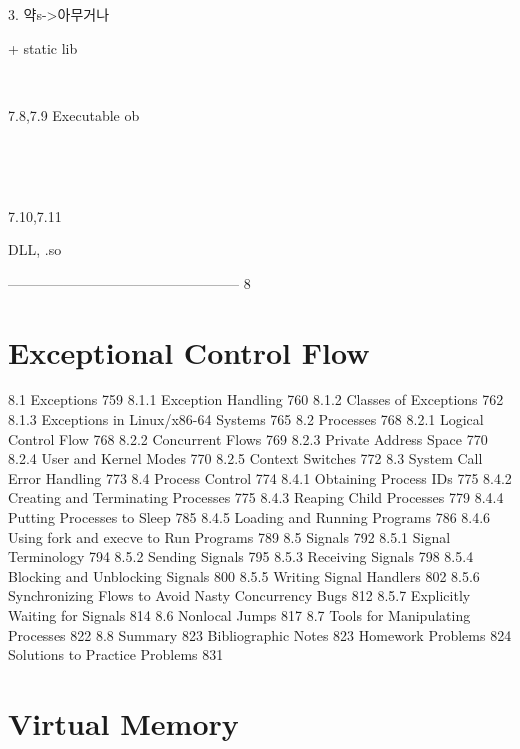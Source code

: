 3. 약s->아무거나

+ static lib

​

7.8,7.9 Executable ob~

​

​

7.10,7.11

DLL, .so 














--------------------------------------------------
8
\section{Exceptional Control Flow}
8.1 Exceptions 759
8.1.1 Exception Handling 760
8.1.2 Classes of Exceptions 762
8.1.3 Exceptions in Linux/x86-64 Systems 765
8.2 Processes 768
8.2.1 Logical Control Flow 768
8.2.2 Concurrent Flows 769
8.2.3 Private Address Space 770
8.2.4 User and Kernel Modes 770
8.2.5 Context Switches 772
8.3 System Call Error Handling 773
8.4 Process Control 774
8.4.1 Obtaining Process IDs 775
8.4.2 Creating and Terminating Processes 775
8.4.3 Reaping Child Processes 779
8.4.4 Putting Processes to Sleep 785
8.4.5 Loading and Running Programs 786
8.4.6 Using fork and execve to Run Programs 789
8.5 Signals 792
8.5.1 Signal Terminology 794
8.5.2 Sending Signals 795
8.5.3 Receiving Signals 798
8.5.4 Blocking and Unblocking Signals 800
8.5.5 Writing Signal Handlers 802
8.5.6 Synchronizing Flows to Avoid Nasty Concurrency Bugs 812
8.5.7 Explicitly Waiting for Signals 814
8.6 Nonlocal Jumps 817
8.7 Tools for Manipulating Processes 822
8.8 Summary 823
Bibliographic Notes 823
Homework Problems 824
Solutions to Practice Problems 831


\section{Virtual Memory}

